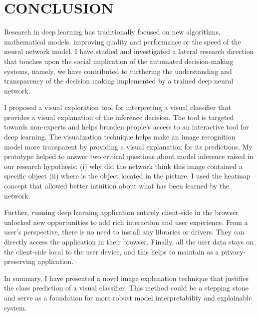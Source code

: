 %
%

\chapter{CONCLUSION}
\thispagestyle{empty}




Research in deep learning has traditionally focused on new algorithms, mathematical models, improving quality and performance or the speed of the neural network model. I have studied and investigated a lateral research direction that touches upon the social implication of the automated decision-making systems, namely, we have contributed to furthering the understanding and transparency of the decision making implemented by a trained deep neural network. 

I proposed a visual exploration tool for interpreting a visual classifier that provides a visual explanation of the inference decision. The tool is targeted towards non-experts and helps broaden people's access to an interactive tool for deep learning. The visualization technique helps make an image recognition model more transparent by providing a visual explanation for its predictions. My prototype helped to answer two critical questions about model inference raised in our research hypothesis: (i) why did the network think this image contained a specific object (ii) where is the object located in the picture. I used the heatmap concept that allowed better intuition about what has been learned by the network.

Further, running deep learning application entirely client-side in the browser unlocked new opportunities to add rich interaction and user experience. From a user's perspective, there is no need to install any libraries or drivers. They can directly access the application in their browser. Finally, all the user data stays on the client-side local to the user device, and this helps to maintain as a privacy-preserving application.

In summary, I have presented a novel image explanation technique that justifies the class prediction of a visual classifier. This method could be a  stepping stone and serve as a foundation for more robust model interpretability and explainable system.


